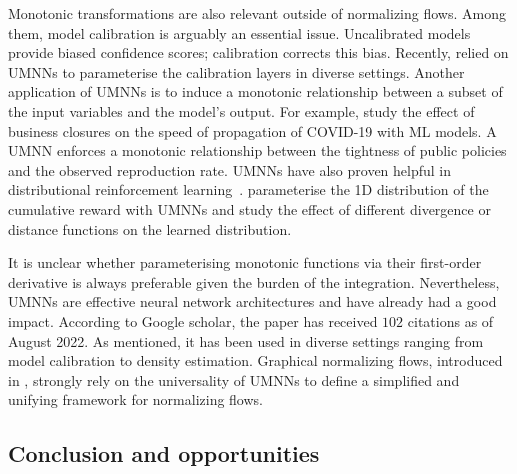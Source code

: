 Monotonic transformations are also relevant outside of normalizing flows. Among them, model calibration is arguably an essential issue. Uncalibrated models provide biased confidence scores; calibration corrects this bias. Recently, \citet{gruber2022trustworthy, deycalibrated, rahimi2020intra} relied on UMNNs to parameterise the calibration layers in diverse settings. Another application of UMNNs is to induce a monotonic relationship between a subset of the input variables and the model's output. For example, \citet{yurk2021county} study the effect of business closures on the speed of propagation of COVID-19 with ML models. A UMNN enforces a monotonic relationship between the tightness of public policies and the observed reproduction rate. UMNNs have also proven helpful in distributional reinforcement learning~\citep{dabney2018distributional}. \citet{theate2021distributional} parameterise the 1D distribution of the cumulative reward with UMNNs and study the effect of different divergence or distance functions on the learned distribution.

It is unclear whether parameterising monotonic functions via their first-order derivative is always preferable given the burden of the integration. Nevertheless, UMNNs are effective neural network architectures and have already had a good impact.
According to Google scholar, the paper has received $102$ citations as of August 2022. As mentioned, it has been used in diverse settings ranging from model calibration to density estimation. Graphical normalizing flows, introduced in , strongly rely on the universality of UMNNs to define a simplified and unifying framework for normalizing flows.



\subsection{Conclusion and opportunities}



